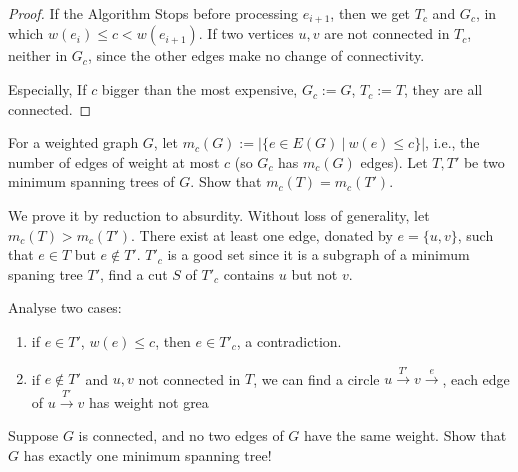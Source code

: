 \documentclass[11pt,a4paper,oneside]{article}
\begin{document}
\begin{problem}{1}
\begin{proof}
		If the Algorithm Stops before processing \(e_{i+1}\), then we get \(T_c\) and \(G_c\), in which \(w(e_{i}) \leq c < w(e_{i + 1})\). If two vertices \(u, v\) are not connected in \(T_c\), neither in \(G_c\), since the other edges make no change of connectivity.
		
		Especially, If \(c\) bigger than the most expensive, \(G_c := G\), \(T_c := T\), they are all connected.
	\end{proof}
\end{problem}

\begin{problem}{2}
	\statement
	For a weighted graph $G$, let $m_c(G) := | \{ e \in E(G) \ | \ w(e) \leq c\}|$, i.e.,
	the number of edges of weight at most $c$ (so $G_c$ has $m_c(G)$ edges).
	Let $T, T'$ be two minimum spanning trees of $G$. Show that
	$m_c(T) = m_c(T')$.

	\solution
	
	We prove it by reduction to absurdity. Without loss of generality, let \(m_c(T) > m_c(T')\). There exist at least one edge, donated by \(e = \{u, v\}\), such that \(e \in T\) but \(e \not\in T'\). \(T'_c\) is a good set since it is a subgraph of a minimum spaning tree \(T'\), find a cut \(S\) of \(T'_c\) contains \(u\) but not \(v\).
	
	Analyse two cases:
	
	\begin{enumerate}
		\item if \(e \in T'\), \(w(e) \leq c\), then \(e \in T'_c\), a contradiction.
		\item if \(e \not\in T'\) and \(u, v\) not connected in \(T\), we can find a circle \(u \xrightarrow{T'} v \xrightarrow{e}\), each edge of \(u \xrightarrow{T'} v\) has weight not grea
	\end{enumerate}
	
\end{problem}
\begin{problem}{3}
	\statement
	Suppose $G$ is connected, and no two edges of $G$ have the same weight. 
	Show that $G$ has exactly one minimum spanning tree!
	
	\solution
\end{problem}
\end{document}
